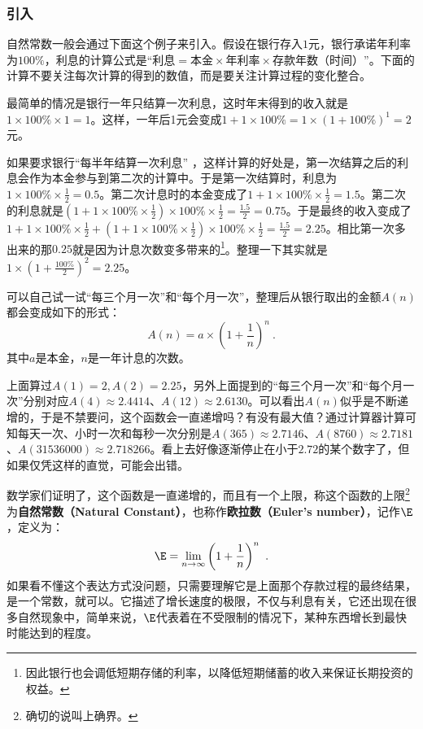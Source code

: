 \subsubsection{引入}

自然常数一般会通过下面这个例子来引入。假设在银行存入$1$元，银行承诺年利率为$100\%$，利息的计算公式是“$\text{利息}=\text{本金}\times\text{年利率}\times\text{存款年数（时间）}$”。下面的计算不要关注每次计算的得到的数值，而是要关注计算过程的变化整合。

最简单的情况是银行一年只结算一次利息，这时年末得到的收入就是$1\times100\%\times1=1$。这样，一年后1元会变成$1+1\times100\%=1\times(1+100\%)^1=2$元。

如果要求银行“每半年结算一次利息” ，这样计算的好处是，第一次结算之后的利息会作为本金参与到第二次的计算中。于是第一次结算时，利息为$\displaystyle1\times100\%\times\frac{1}{2}=0.5$。第二次计息时的本金变成了$\displaystyle1+1\times100\%\times\frac{1}{2}=1.5$。第二次的利息就是$\displaystyle(1+1\times100\%\times\frac{1}{2})\times100\%\times\frac{1}{2}=\frac{1.5}{2}=0.75$。于是最终的收入变成了$\displaystyle1+1\times100\%\times\frac{1}{2}+(1+1\times100\%\times\frac{1}{2})\times100\%\times\frac{1}{2}=\frac{1.5}{2}=2.25$。相比第一次多出来的那$0.25$就是因为计息次数变多带来的\footnote{因此银行也会调低短期存储的利率，以降低短期储蓄的收入来保证长期投资的权益。}。整理一下其实就是$1\times(1+\frac{100\%}{2})^2=2.25$。

可以自己试一试“每三个月一次”和“每个月一次”，整理后从银行取出的金额$A(n)$都会变成如下的形式：
\begin{equation}
A(n)=a\times\left(1+\frac{1}{n}\right)^n~.
\end{equation}
其中$a$是本金，$n$是一年计息的次数。

上面算过$A(1)=2,A(2)=2.25$，另外上面提到的“每三个月一次”和“每个月一次”分别对应$A(4)\approx 2.4414$、$A(12)\approx 2.6130$。可以看出$A(n)$似乎是不断递增的，于是不禁要问，这个函数会一直递增吗？有没有最大值？通过计算器计算可知每天一次、小时一次和每秒一次分别是$A(365)\approx 2.7146$、$A(8760)\approx2.7181$、$A(31536000)\approx 2.718266$。看上去好像逐渐停止在小于$2.72$的某个数字了，但如果仅凭这样的直觉，可能会出错。

数学家们证明了，这个函数是一直递增的，而且有一个上限，称这个函数的上限\footnote{确切的说叫上确界。}为\textbf{自然常数（Natural Constant）}，也称作\textbf{欧拉数（Euler's number）}，记作$\E$，定义为：
\begin{equation}
\E = \lim_{n \to \infty} \left( 1 + \frac{1}{n} \right)^n~.
\end{equation}
如果看不懂这个表达方式没问题，只需要理解它是上面那个存款过程的最终结果，是一个常数，就可以。它描述了增长速度的极限，不仅与利息有关，它还出现在很多自然现象中，简单来说，$\E$代表着在不受限制的情况下，某种东西增长到最快时能达到的程度。

